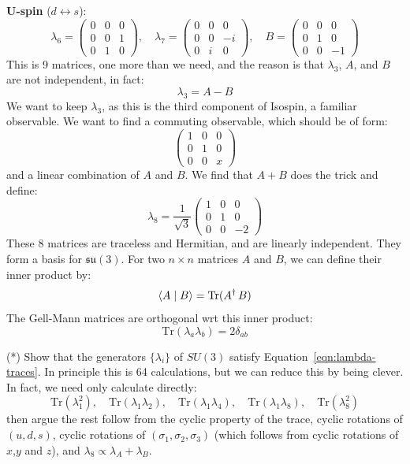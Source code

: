 \documentclass[12pt]{article}
\begin{document}
\noindent\textbf{U-spin} ($d\leftrightarrow s$):
\begin{equation*}
  \lambda_6 =
  \begin{pmatrix} 0 & 0 & 0 \\ 0 & 0 & 1 \\ 0 & 1 & 0 \end{pmatrix},\quad
  \lambda_7 =
  \begin{pmatrix} 0 & 0 & 0 \\ 0 & 0 & -i \\ 0 & i & 0 \end{pmatrix},\quad
  B =
  \begin{pmatrix} 0 & 0 & 0 \\ 0 & 1 & 0 \\ 0 & 0 & -1 \end{pmatrix}
\end{equation*}
This is 9 matrices, one more than we need, and the reason is that $\lambda_3$, $A$, and $B$ are not independent, in fact:
$$\lambda_3 = A - B$$
We want to keep $\lambda_3$, as this is the third component of Isospin, a familiar observable.  We want to find a commuting observable, which should be of form:
$$\begin{pmatrix} 1 & 0 & 0 \\ 0 & 1 & 0 \\ 0 & 0 & x \end{pmatrix}$$
and a linear combination of $A$ and $B$.  We find that $A+B$ does the trick and define:
\begin{equation*}
\lambda_8 =
  \frac{1}{\sqrt{3}} 
  \begin{pmatrix} 1 & 0 & 0 \\ 0 & 1 & 0 \\ 0 & 0 & -2 \end{pmatrix}
\end{equation*}
These 8 matrices are traceless and Hermitian, and are linearly
independent. They form a basis for $\mathfrak{su}(3)$.  
For two $n\times n$ matrices $A$ and $B$, we can define their inner product by:
$$\braket{A \mid B} = {\rm Tr}(A^\dagger\,B)$$
The Gell-Mann matrices are orthogonal wrt this inner product:
\begin{equation}
\label{eqn:lambda-traces}
  \mathrm{Tr}(\lambda_a \lambda_b) = 2 \delta_{ab}
\end{equation}


\exercise (*) Show that the generators $\{\lambda_i\}$ of $SU(3)$
satisfy Equation~\ref{eqn:lambda-traces}. In principle this is 64
calculations, but we can reduce this by being clever. In fact, we need
only calculate directly:
\begin{equation*}
  \mathrm{Tr}(\lambda_1^2),\quad
  \mathrm{Tr}(\lambda_1\lambda_2),\quad
  \mathrm{Tr}(\lambda_1\lambda_4),\quad
  \mathrm{Tr}(\lambda_1\lambda_8),\quad
  \mathrm{Tr}(\lambda_8^2)
\end{equation*}
then argue the rest follow from the cyclic property of the trace,
cyclic rotations of $(u,d,s)$, cyclic rotations of $(\sigma_1,
\sigma_2, \sigma_3)$ (which follows from cyclic rotations of $x$,$y$
and $z$), and $\lambda_8 \propto \lambda_A + \lambda_B$.\\[5pt]
\end{document}
